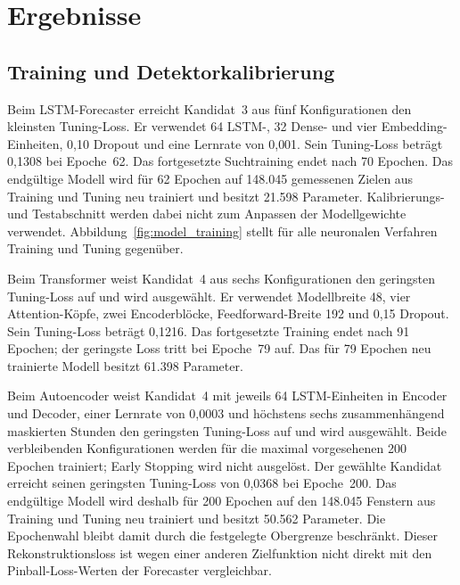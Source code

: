 \chapter{Ergebnisse}
\label{ch:Ergebnisse}

\section{Training und Detektorkalibrierung}

Beim LSTM-Forecaster erreicht Kandidat~3 aus fünf Konfigurationen den
kleinsten Tuning-Loss. Er verwendet 64 LSTM-, 32 Dense- und vier
Embedding-Einheiten, 0{,}10 Dropout und eine Lernrate von 0{,}001. Sein
Tuning-Loss beträgt 0{,}1308 bei Epoche~62. Das fortgesetzte Suchtraining
endet nach 70 Epochen. Das endgültige Modell wird für 62 Epochen auf 148.045
gemessenen Zielen aus Training und Tuning neu trainiert und besitzt 21.598
Parameter. Kalibrierungs- und Testabschnitt werden dabei
nicht zum Anpassen der Modellgewichte verwendet. Abbildung~\ref{fig:model_training}
stellt für alle neuronalen Verfahren Training und Tuning gegenüber.

Beim Transformer weist Kandidat~4 aus sechs Konfigurationen den geringsten
Tuning-Loss auf und wird ausgewählt. Er verwendet Modellbreite 48, vier
Attention-Köpfe, zwei Encoderblöcke,
Feedforward-Breite 192 und 0{,}15 Dropout. Sein Tuning-Loss beträgt 0{,}1216.
Das fortgesetzte Training endet nach 91 Epochen; der geringste Loss tritt bei
Epoche~79 auf.
Das für 79 Epochen neu trainierte Modell besitzt 61.398 Parameter.

Beim Autoencoder weist Kandidat~4 mit jeweils 64 LSTM-Einheiten in Encoder
und Decoder, einer Lernrate von 0{,}0003 und höchstens sechs zusammenhängend
maskierten Stunden den geringsten Tuning-Loss auf und wird ausgewählt. Beide
verbleibenden Konfigurationen werden für die maximal vorgesehenen 200 Epochen
trainiert; Early Stopping wird nicht ausgelöst. Der gewählte Kandidat erreicht
seinen geringsten Tuning-Loss von 0{,}0368 bei Epoche~200. Das endgültige Modell
wird deshalb für 200 Epochen auf den 148.045 Fenstern aus Training und Tuning
neu trainiert und besitzt 50.562 Parameter. Die Epochenwahl bleibt damit durch
die festgelegte Obergrenze beschränkt. Dieser Rekonstruktionsloss ist wegen
einer anderen Zielfunktion nicht direkt mit den Pinball-Loss-Werten der
Forecaster vergleichbar.

